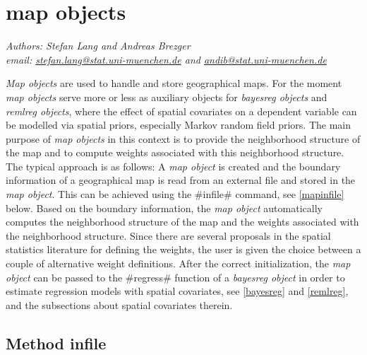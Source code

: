 \chapter{map objects}
\label{map} 


{\em Authors: Stefan Lang and Andreas Brezger} \\
{\em email: \href{mailto:stefan.lang@stat.uni-muenchen.de}{stefan.lang@stat.uni-muenchen.de} and \href{mailto:andib@stat.uni-muenchen.de}{andib@stat.uni-muenchen.de}}\\
\vspace{0.3cm}


{\em Map objects} are used to handle and store geographical maps.
For the moment {\em map objects} serve more or less as auxiliary
objects for {\em bayesreg objects} and {\em remlreg objects},
where the effect of spatial covariates on a dependent variable can
be modelled via spatial priors, especially Markov random field
priors. The main purpose of {\em map objects} in this context is
to provide the neighborhood structure of the map and to compute
weights associated with this neighborhood structure. The typical
approach is as follows: A {\em map object} is created and the
boundary information of a geographical map is read from an
external file and stored in the {\em map object}. This can be
achieved using the #infile# command, see \autoref{mapinfile}
below. Based on the boundary information, the {\em map object}
automatically computes the neighborhood structure of the map and
the weights associated with the neighborhood structure. Since
there are several proposals in the spatial statistics literature
for defining the weights, the user is given the choice between a
couple of alternative weight definitions. After the correct
initialization, the {\em map object} can be passed to the
#regress# function of a {\em bayesreg object} in order to estimate
regression models with spatial covariates, see \autoref{bayesreg}
and \autoref{remlreg}, and the subsections about spatial
covariates therein.

\clearpage



\section{Method infile}
\label{mapinfile}    
 

